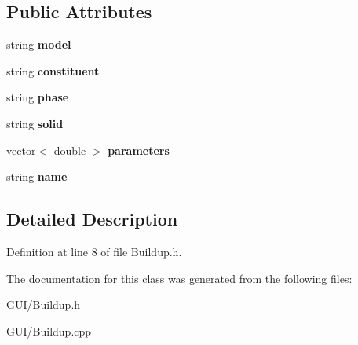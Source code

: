 \subsection*{Public Attributes}
\begin{DoxyCompactItemize}
\item 
\mbox{\label{class_c_buildup_a3f53c4f1813eb419942dd0bd321dcd96}} 
string {\bfseries model}
\item 
\mbox{\label{class_c_buildup_a2e8123d2f89fdae148a1914cb1278b28}} 
string {\bfseries constituent}
\item 
\mbox{\label{class_c_buildup_a4f23646191af5c14d6be229d5d7341f4}} 
string {\bfseries phase}
\item 
\mbox{\label{class_c_buildup_a2c81d1f2b292e83cd4cb445ab7c0fb0f}} 
string {\bfseries solid}
\item 
\mbox{\label{class_c_buildup_ab47d468599f3c6b7eed6d092b035d5b0}} 
vector$<$ double $>$ {\bfseries parameters}
\item 
\mbox{\label{class_c_buildup_a9730e775dd5542f5da5ef9af4d720b15}} 
string {\bfseries name}
\end{DoxyCompactItemize}


\subsection{Detailed Description}


Definition at line 8 of file Buildup.\+h.



The documentation for this class was generated from the following files\+:\begin{DoxyCompactItemize}
\item 
G\+U\+I/Buildup.\+h\item 
G\+U\+I/Buildup.\+cpp\end{DoxyCompactItemize}

